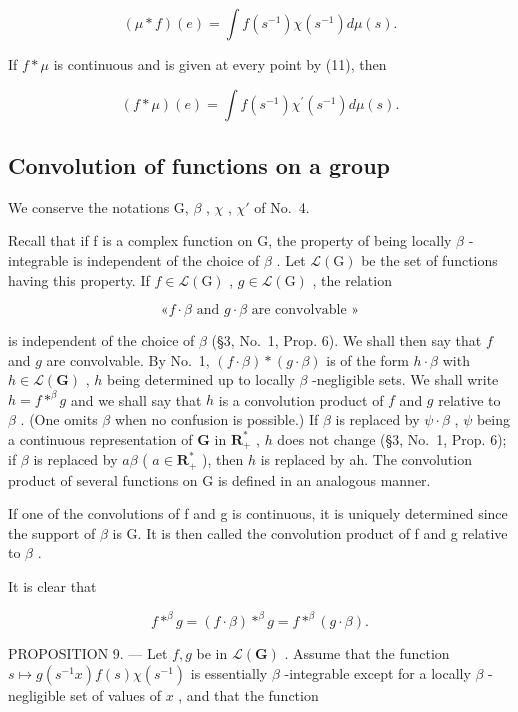 \[
(\mu * f) (e) = \int f (s ^ {- 1}) \chi (s ^ {- 1}) d \mu (s).\tag{12}
\]

If \(f * \mu\) is continuous and is given at every point by (11), then

\[
(f * \mu) (e) = \int f (s ^ {- 1}) \chi^ {\prime} (s ^ {- 1}) d \mu (s).\tag{13}
\]

\subsection{Convolution of functions on a group}

We conserve the notations G, \(\beta\) , \(\chi\) , \(\chi'\) of No.~4.

Recall that if f is a complex function on G, the property of being locally \(\beta\) -integrable is independent of the choice of \(\beta\) . Let \(\mathcal{L}(\mathrm{G})\) be the set of functions having this property. If \(f \in \mathcal{L}(\mathrm{G})\) , \(g \in \mathcal{L}(\mathrm{G})\) , the relation

\[\text{«}f \cdot \beta\text{ and }g \cdot \beta\text{ are convolvable »}\]

is independent of the choice of \(\beta\) (§3, No.~1, Prop. 6). We shall then say that \(f\) and \(g\) are convolvable. By No.~1, \((f\cdot \beta)*(g\cdot \beta)\) is of the form \(h\cdot \beta\) with \(h\in \mathcal{L}(\mathbf{G})\) , \(h\) being determined up to locally \(\beta\) -negligible sets. We shall write \(h = f * ^ {\beta} g\) and we shall say that \(h\) is a convolution product of \(f\) and \(g\) relative to \(\beta\) . (One omits \(\beta\) when no confusion is possible.) If \(\beta\) is replaced by \(\psi \cdot \beta\) , \(\psi\) being a continuous representation of \(\mathbf{G}\) in \(\mathbf{R}_+^*\) , \(h\) does not change (§3, No.~1, Prop. 6); if \(\beta\) is replaced by \(a\beta\) ( \(a\in \mathbf{R}_+^*\) ), then \(h\) is replaced by ah. The convolution product of several functions on G is defined in an analogous manner.

If one of the convolutions of f and g is continuous, it is uniquely determined since the support of \(\beta\) is G. It is then called the convolution product of f and g relative to \(\beta\) .

It is clear that

\[
f * ^ {\beta} g = (f \cdot \beta) * ^ {\beta} g = f * ^ {\beta} (g \cdot \beta).\tag{14}
\]

PROPOSITION 9. --- Let \(f,g\) be in \(\mathcal{L}(\mathbf{G})\) . Assume that the function \(s\mapsto g(s^{-1}x)f(s)\chi(s^{-1})\) is essentially \(\beta\) -integrable except for a locally \(\beta\) -negligible set of values of \(x\) , and that the function

